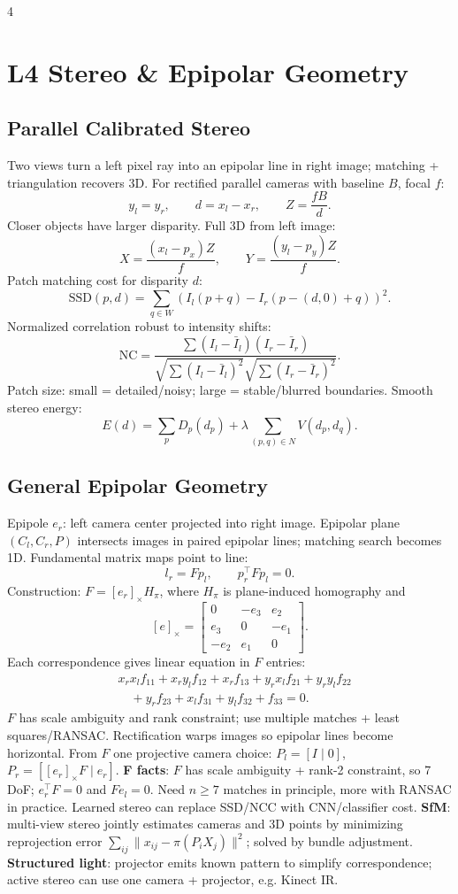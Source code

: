 \documentclass[8pt,a4paper,landscape]{extarticle}
\newcommand{\key}[1]{\textbf{#1}}
\begin{document}
\begin{multicols*}{4}
\section{L4 Stereo \& Epipolar Geometry}
\subsection{Parallel Calibrated Stereo}
Two views turn a left pixel ray into an epipolar line in right image; matching + triangulation recovers 3D. For rectified parallel cameras with baseline $B$, focal $f$:
\[
y_l=y_r,\qquad d=x_l-x_r,\qquad Z=\frac{fB}{d}.
\]
Closer objects have larger disparity. Full 3D from left image:
\[
X=\frac{(x_l-p_x)Z}{f},\qquad Y=\frac{(y_l-p_y)Z}{f}.
\]
Patch matching cost for disparity $d$:
\[
\mathrm{SSD}(p,d)=\sum_{q\in W}(I_l(p+q)-I_r(p-(d,0)+q))^2.
\]
Normalized correlation robust to intensity shifts:
\[
\mathrm{NC}=\frac{\sum (I_l-\bar I_l)(I_r-\bar I_r)}
{\sqrt{\sum(I_l-\bar I_l)^2}\sqrt{\sum(I_r-\bar I_r)^2}}.
\]
Patch size: small = detailed/noisy; large = stable/blurred boundaries. Smooth stereo energy:
\[
E(d)=\sum_pD_p(d_p)+\lambda\sum_{(p,q)\in N}V(d_p,d_q).
\]

\subsection{General Epipolar Geometry}
Epipole $e_r$: left camera center projected into right image. Epipolar plane $(C_l,C_r,P)$ intersects images in paired epipolar lines; matching search becomes 1D. Fundamental matrix maps point to line:
\[
l_r=Fp_l,\qquad p_r^\top Fp_l=0.
\]
Construction: $F=[e_r]_\times H_\pi$, where $H_\pi$ is plane-induced homography and
\[
[e]_\times=\begin{bmatrix}0&-e_3&e_2\\e_3&0&-e_1\\-e_2&e_1&0\end{bmatrix}.
\]
Each correspondence gives linear equation in $F$ entries:
\[
\begin{aligned}
&x_rx_lf_{11}+x_ry_lf_{12}+x_rf_{13}
+y_rx_lf_{21}+y_ry_lf_{22}\\
&\quad +y_rf_{23}+x_lf_{31}+y_lf_{32}+f_{33}=0 .
\end{aligned}
\]
$F$ has scale ambiguity and rank constraint; use multiple matches + least squares/RANSAC. Rectification warps images so epipolar lines become horizontal. From $F$ one projective camera choice: $P_l=[I\mid0]$, $P_r=[[e_r]_\times F\mid e_r]$.
\key{F facts}: $F$ has scale ambiguity + rank-2 constraint, so 7 DoF; $e_r^\top F=0$ and $Fe_l=0$. Need $n\ge7$ matches in principle, more with RANSAC in practice. Learned stereo can replace SSD/NCC with CNN/classifier cost. \key{SfM}: multi-view stereo jointly estimates cameras and 3D points by minimizing reprojection error $\sum_{ij}\|x_{ij}-\pi(P_iX_j)\|^2$; solved by bundle adjustment. \key{Structured light}: projector emits known pattern to simplify correspondence; active stereo can use one camera + projector, e.g. Kinect IR.


\end{multicols*}
\end{document}
